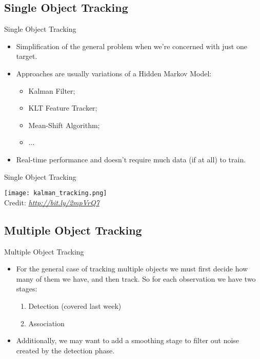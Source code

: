 \subsection{Single Object Tracking}
\begin{frame}{Single Object Tracking}
	\begin{itemize}
		\item Simplification of the general problem when we're concerned with just one target.
		\item Approaches are usually variations of a Hidden Markov Model:
		\begin{itemize}
			\item Kalman Filter;
			\item KLT Feature Tracker;
			\item Mean-Shift Algorithm;
			\item ...
		\end{itemize}
		\item Real-time performance and doesn't require much data (if at all) to train.
	\end{itemize}
\end{frame}


\begin{frame}{Single Object Tracking}
	\begin{center}
		\texttt{[image: kalman\_tracking.png]}\\[-1ex]
		{\tiny Credit: {\itshape \url{http://bit.ly/2mpVrQ7}}}
	\end{center}
\end{frame}

\subsection{Multiple Object Tracking}
\begin{frame}{Multiple Object Tracking}
	\begin{itemize}
		\item For the general case of tracking multiple objects we must first decide how many of them we have, and then track. So for each observation we have two stages:
		\begin{enumerate}
			\item Detection {\scriptsize (covered last week)}
			\item Association
		\end{enumerate}
		\item Additionally, we may want to add a smoothing stage to filter out noise created by the detection phase.
	\end{itemize}
\end{frame}


